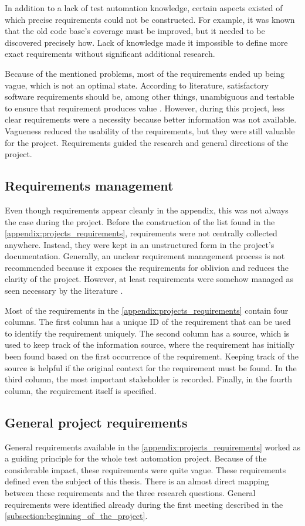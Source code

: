In addition to a lack of test automation knowledge, certain aspects existed of which precise requirements could not be constructed. For example, it was known that the old code base's coverage must be improved, but it needed to be discovered precisely how. Lack of knowledge made it impossible to define more exact requirements without significant additional research.

Because of the mentioned problems, most of the requirements ended up being vague, which is not an optimal state. According to literature, satisfactory software requirements should be, among other things, unambiguous and testable to ensure that requirement produces value \cite{firesmith2003specifying}. However, during this project, less clear requirements were a necessity because better information was not available. Vagueness reduced the usability of the requirements, but they were still valuable for the project. Requirements guided the research and general directions of the project.

\subsection{Requirements management}
Even though requirements appear cleanly in the appendix, this was not always the case during the project. Before the construction of the list found in the \autoref{appendix:projects_requirements}, requirements were not centrally collected anywhere. Instead, they were kept in an unstructured form in the project's documentation. Generally, an unclear requirement management process is not recommended because it exposes the requirements for oblivion and reduces the clarity of the project. However, at least requirements were somehow managed as seen necessary by the literature \cite{hood2007requirements}.

Most of the requirements in the \autoref{appendix:projects_requirements} contain four columns. The first column has a unique ID of the requirement that can be used to identify the requirement uniquely. The second column has a source, which is used to keep track of the information source, where the requirement has initially been found based on the first occurrence of the requirement. Keeping track of the source is helpful if the original context for the requirement must be found. In the third column, the most important stakeholder is recorded. Finally, in the fourth column, the requirement itself is specified.

\subsection{General project requirements}
General requirements available in the \autoref{appendix:projects_requirements} worked as a guiding principle for the whole test automation project. Because of the considerable impact, these requirements were quite vague. These requirements defined even the subject of this thesis. There is an almost direct mapping between these requirements and the three research questions. General requirements were identified already during the first meeting described in the \autoref{subsection:beginning_of_the_project}.

